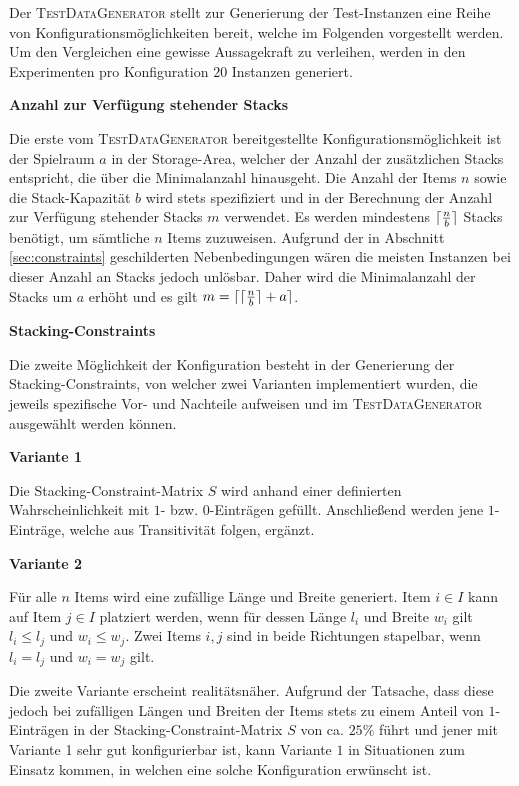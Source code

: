 Der \textsc{TestDataGenerator} stellt zur Generierung der Test-Instanzen eine Reihe von Konfigurationsmöglichkeiten
bereit, welche im Folgenden vorgestellt werden. Um den Vergleichen eine gewisse Aussagekraft zu verleihen,
werden in den Experimenten pro Konfiguration $20$ Instanzen generiert.

\textbf{Anzahl zur Verfügung stehender Stacks}

Die erste vom \textsc{TestDataGenerator} bereitgestellte Konfigurationsmöglichkeit ist der Spielraum $a$ in der Storage-Area, welcher der Anzahl der zusätzlichen Stacks entspricht, die über die Minimalanzahl hinausgeht.
Die Anzahl der Items $n$ sowie die Stack-Kapazität $b$ wird stets spezifiziert und in der Berechnung der Anzahl zur Verfügung stehender Stacks $m$ verwendet. Es werden mindestens $\lceil\frac{n}{b}\rceil$ Stacks benötigt, um sämtliche $n$ Items zuzuweisen.
Aufgrund der in Abschnitt \ref{sec:constraints} geschilderten Nebenbedingungen wären die meisten Instanzen bei dieser
Anzahl an Stacks jedoch unlösbar. Daher wird die Minimalanzahl der Stacks um $a$ erhöht und es gilt
$m = \lceil\lceil\frac{n}{b}\rceil + a\rceil$.

\textbf{Stacking-Constraints}

Die zweite Möglichkeit der Konfiguration besteht in der Generierung der Stacking-Constraints,
von welcher zwei Varianten implementiert wurden, die jeweils spezifische Vor- und Nachteile aufweisen
und im \textsc{TestDataGenerator} ausgewählt werden können.

\textbf{Variante 1}

Die Stacking-Constraint-Matrix $S$ wird anhand einer definierten Wahrscheinlichkeit mit $1$- bzw. $0$-Einträgen gefüllt. Anschließend werden jene $1$-Einträge, welche aus Transitivität folgen, ergänzt.

\textbf{Variante 2}

Für alle $n$ Items wird eine zufällige Länge und Breite generiert. Item $i \in I$ kann auf Item $j \in I$
platziert werden, wenn für dessen Länge $l_i$ und Breite $w_i$ gilt $l_i \leq l_j$ und $w_i \leq w_j$.
Zwei Items $i, j$ sind in beide Richtungen stapelbar, wenn $l_i = l_j$ und $w_i = w_j$ gilt.

Die zweite Variante erscheint realitätsnäher. Aufgrund der Tatsache, dass diese jedoch bei zufälligen Längen und
Breiten der Items stets zu einem Anteil von $1$-Einträgen in der Stacking-Constraint-Matrix $S$ von ca. $25\%$ führt
und jener mit Variante 1 sehr gut konfigurierbar ist, kann Variante $1$ in Situationen zum Einsatz kommen,
in welchen eine solche Konfiguration erwünscht ist.

